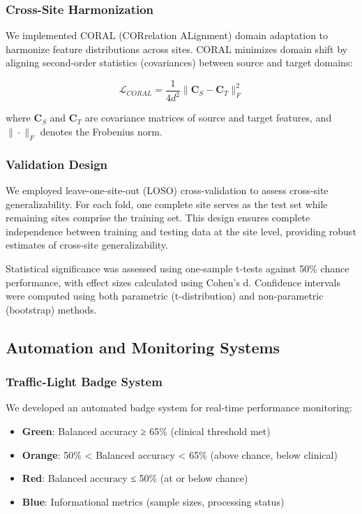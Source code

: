 \documentclass[11pt]{article}
\begin{document}
\subsubsection{Cross-Site Harmonization}

We implemented CORAL (CORrelation ALignment) domain adaptation to harmonize feature distributions across sites\cite{sun2016deep}. CORAL minimizes domain shift by aligning second-order statistics (covariances) between source and target domains:

$$\mathcal{L}_{CORAL} = \frac{1}{4d^2} \|\mathbf{C}_S - \mathbf{C}_T\|_F^2$$

where $\mathbf{C}_S$ and $\mathbf{C}_T$ are covariance matrices of source and target features, and $\|\cdot\|_F$ denotes the Frobenius norm.

\subsubsection{Validation Design}

We employed leave-one-site-out (LOSO) cross-validation to assess cross-site generalizability. For each fold, one complete site serves as the test set while remaining sites comprise the training set. This design ensures complete independence between training and testing data at the site level, providing robust estimates of cross-site generalizability.

Statistical significance was assessed using one-sample t-tests against 50\% chance performance, with effect sizes calculated using Cohen's d. Confidence intervals were computed using both parametric (t-distribution) and non-parametric (bootstrap) methods.

\subsection{Automation and Monitoring Systems}

\subsubsection{Traffic-Light Badge System}

We developed an automated badge system for real-time performance monitoring:
\begin{itemize}
\item \textbf{Green}: Balanced accuracy ≥ 65\% (clinical threshold met)
\item \textbf{Orange}: 50\% < Balanced accuracy < 65\% (above chance, below clinical)
\item \textbf{Red}: Balanced accuracy ≤ 50\% (at or below chance)
\item \textbf{Blue}: Informational metrics (sample sizes, processing status)
\end{itemize}
\end{document}
